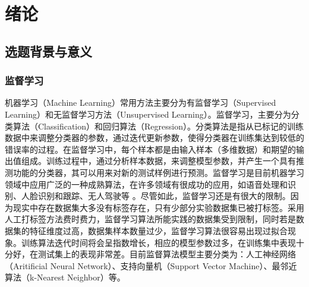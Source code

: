 \documentclass[oneside]{ZJUthesis}
\begin{document}
\mainmatter
\chapter{绪论}
\section{选题背景与意义}
\subsection{监督学习}
机器学习（Machine Learning）常用方法主要分为有监督学习（Supervised Learning）和无监督学习方法（Unsupervised Learning）。监督学习，主要分为分类算法（Classification）和回归算法（Regression）。分类算法是指从已标记的训练数据中来调整分类器的参数，通过迭代更新参数，使得分类器在训练集达到较低的错误率的过程。在监督学习中，每个样本都是由输入样本（多维数据）和期望的输出值组成。训练过程中，通过分析样本数据，来调整模型参数，并产生一个具有推测功能的分类器，其可以用来对新的测试样例进行预测。监督学习是目前机器学习领域中应用广泛的一种成熟算法，在许多领域有很成功的应用，如语音处理和识别、人脸识别和跟踪、无人驾驶等\cite{DBLP:journals/taslp/DahlYDA12,DBLP:conf/icml/Boulanger-LewandowskiBV12,DBLP:journals/neco/HintonOT06,DBLP:conf/nips/BengioLPL06,DBLP:conf/interspeech/YaoZHSY13,DBLP:conf/interspeech/MikolovKBCK10,DBLP:conf/emnlp/SocherPHNM11} 。尽管如此，监督学习还是有很大的限制。因为现实中存在数据集大多没有标签存在，只有少部分实验数据集已被打标签。采用人工打标签方法费时费力，监督学习算法所能实践的数据集受到限制，同时若是数据集的特征维度过高，数据集样本数量过少，监督学习算法很容易出现过拟合现象。训练算法迭代时间将会呈指数增长，相应的模型参数过多，在训练集中表现十分好，在测试集上的表现非常差。目前监督算法模型主要分类为：人工神经网络（Aritificial Neural Network）、支持向量机（Support Vector Machine）、最邻近算法（k-Nearest Neighbor）等。
\end{document}
